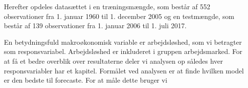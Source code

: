 %
Herefter opdeles datasættet i en træningsmængde, som består af 552 observationer fra 1. januar 1960 til 1. december 2005 og en testmængde, som består af 139 observationer fra 1. januar 2006 til 1. juli 2017. 

En betydningsfuld makroøkonomisk variable er arbejdsløshed, som vi betragter som responsvariabel.  
Arbejdsløshed er inkluderet i gruppen arbejdsmarked.
For at få et bedre overblik over resultaterne deler vi analysen op således hver responsvariabler har et kapitel. 
Formålet ved analysen er at finde hvilken model er den bedste til forecaste. For at måle dette bruger vi 


